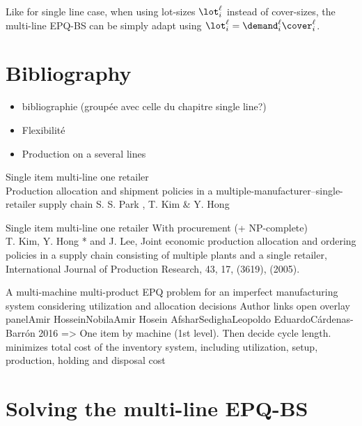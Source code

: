 Like for single line case, when using lot-sizes $\lot_i^{\ell}$ instead of cover-sizes, the multi-line EPQ-BS can be simply adapt using $\lot_i^{\ell}=\demand_i^{\ell}\cover_i^{\ell}$.



\section{Bibliography}

\begin{itemize}
  \item bibliographie (groupée avec celle du chapitre single line?)
  \item Flexibilité
  \item Production on a several lines
\end{itemize}


Single item multi-line one retailer\\
Production allocation and shipment policies in a multiple-manufacturer–single-retailer supply chain
S. S. Park , T. Kim \& Y. Hong 


Single item multi-line one retailer With procurement (+ NP-complete)\\
T. Kim, Y. Hong * and J. Lee, Joint economic production allocation and ordering policies in a supply chain consisting of multiple plants and a single retailer, International Journal of Production Research, 43, 17, (3619), (2005).


A multi-machine multi-product EPQ problem for an imperfect manufacturing system considering utilization and allocation decisions
Author links open overlay panelAmir HosseinNobilaAmir Hosein AfsharSedighaLeopoldo EduardoCárdenas-Barrón
2016
=> One item by machine (1st level). Then decide cycle length.
minimizes total cost of the inventory system, including utilization, setup, production, holding and disposal cost


\section{Solving the multi-line EPQ-BS}





